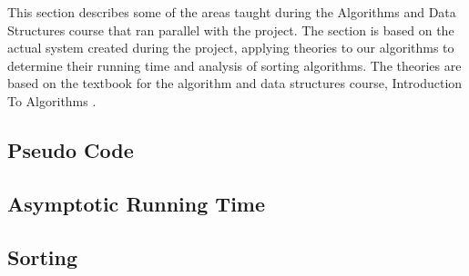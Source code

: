 This section describes some of the areas taught during the Algorithms and Data Structures course that ran parallel with the project. The section is based on the actual system created during the project, applying theories to our algorithms to determine their running time and analysis of sorting algorithms. The theories are based on the textbook for the algorithm and data structures course, Introduction To Algorithms \cite{IntroToAlgorithms}.

\subsection{Pseudo Code}
\label{PesudoCode}

\subsection{Asymptotic Running Time}
\label{AsymptoticTime}

\subsection{Sorting}
\label{Sorting}
